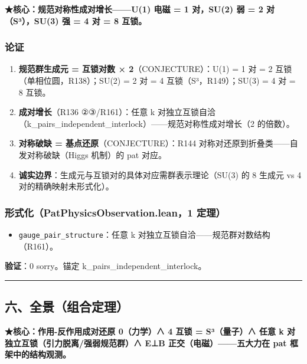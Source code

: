 \documentclass[
]{article}
\providecommand{\tightlist}{%
  \setlength{\itemsep}{0pt}\setlength{\parskip}{0pt}}
\begin{document}
\textbf{★核心：规范对称性成对增长------U(1) 电磁 = 1 对，SU(2) 弱 = 2
对（S³），SU(3) 强 = 4 对 = 8 互锁。}

\subsubsection{论证}\label{ux8bbaux8bc1-4}

\begin{enumerate}
\def\labelenumi{\arabic{enumi}.}
\tightlist
\item
  \textbf{规范群生成元 = 互锁对数 × 2}（CONJECTURE）：U(1) = 1 对 = 2
  互锁（单相位圆，R138）；SU(2) = 2 对 = 4 互锁（S³，R149）；SU(3) = 4
  对 = 8 互锁。
\item
  \textbf{成对增长}（R136 ②③/R161）：任意 k
  对独立互锁自洽（k\_pairs\_independent\_interlock）------规范对称性成对增长（2
  的倍数）。
\item
  \textbf{对称破缺 = 基点还原}（CONJECTURE）：R144
  对称对还原到折叠类------自发对称破缺（Higgs 机制）的 pat 对应。
\item
  \textbf{诚实边界}：生成元与互锁对的具体对应需群表示理论（SU(3) 的 8
  生成元 vs 4 对的精确映射未形式化）。
\end{enumerate}

\subsubsection{形式化（PatPhysicsObservation.lean，1
定理）}\label{ux5f62ux5f0fux5316patphysicsobservation.lean1-ux5b9aux7406-2}

\begin{itemize}
\tightlist
\item
  \texttt{gauge\_pair\_structure}：任意 k
  对独立互锁自洽------规范群对数结构（R161）。
\end{itemize}

\textbf{验证}：0 sorry。锚定 k\_pairs\_independent\_interlock。

\begin{center}\rule{0.5\linewidth}{0.5pt}\end{center}

\subsection{六、全景（组合定理）}\label{ux516dux5168ux666fux7ec4ux5408ux5b9aux7406}

\textbf{★核心：作用-反作用成对还原 0（力学）∧ 4 互锁 = S³（量子）∧ 任意
k 对独立互锁（引力脱离/强弱规范群）∧ E⊥B 正交（电磁）------五大力在 pat
框架中的结构观测。}
\end{document}
